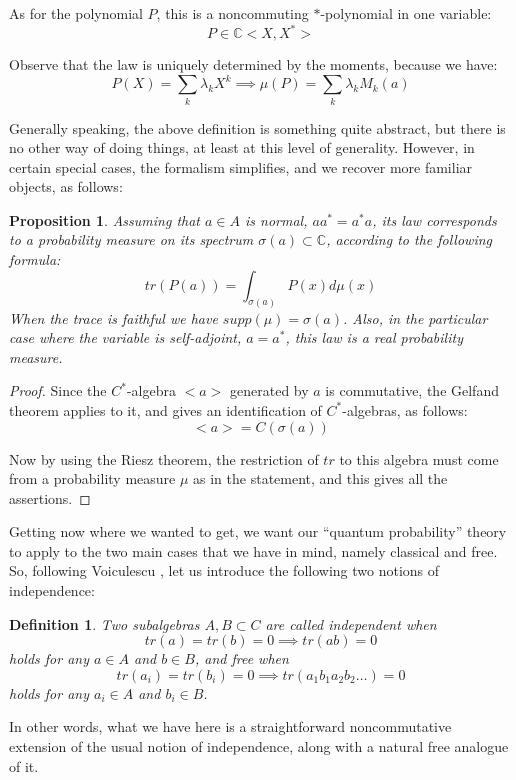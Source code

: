 \documentclass[12pt]{amsbook}
\newtheorem{definition}[theorem]{Definition}
\newtheorem{proposition}[theorem]{Proposition}
\begin{document}
As for the polynomial $P$, this is a noncommuting $*$-polynomial in one variable:
$$P\in\mathbb C<X,X^*>$$

Observe that the law is uniquely determined by the moments, because we have:
$$P(X)=\sum_k\lambda_kX^k\implies\mu(P)=\sum_k\lambda_kM_k(a)$$

Generally speaking, the above definition is something quite abstract, but there is no other way of doing things, at least at this level of generality. However, in certain special cases, the formalism simplifies, and we recover more familiar objects, as follows:


\begin{proposition}
Assuming that $a\in A$ is normal, $aa^*=a^*a$, its law corresponds to a probability measure on its spectrum $\sigma(a)\subset\mathbb C$, according to the following formula:
$$tr(P(a))=\int_{\sigma(a)}P(x)d\mu(x)$$
When the trace is faithful we have $supp(\mu)=\sigma(a)$. Also, in the particular case where the variable is self-adjoint, $a=a^*$, this law is a real probability measure.
\end{proposition}

\begin{proof}
Since the $C^*$-algebra $<a>$ generated by $a$ is commutative, the Gelfand theorem applies to it, and gives an identification of $C^*$-algebras, as follows:
$$<a>=C(\sigma(a))$$

Now by using the Riesz theorem, the restriction of $tr$ to this algebra must come from a probability measure $\mu$ as in the statement, and this gives all the assertions.
\end{proof}

Getting now where we wanted to get, we want our ``quantum probability'' theory to apply to the two main cases that we have in mind, namely classical and free. So, following Voiculescu \cite{vdn}, let us introduce the following two notions of independence:


\begin{definition}
Two subalgebras $A,B\subset C$ are called independent when
$$tr(a)=tr(b)=0\implies tr(ab)=0$$
holds for any $a\in A$ and $b\in B$, and free when
$$tr(a_i)=tr(b_i)=0\implies tr(a_1b_1a_2b_2\ldots)=0$$
holds for any $a_i\in A$ and $b_i\in B$.
\end{definition}
 
In other words, what we have here is a straightforward noncommutative extension of the usual notion of independence, along with a natural free analogue of it. 
\end{document}
